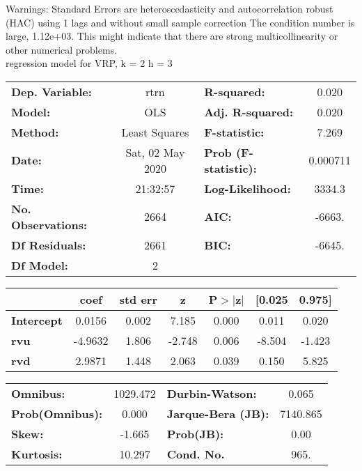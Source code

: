 Warnings: \newline
 [1] Standard Errors are heteroscedasticity and autocorrelation robust (HAC) using 1 lags and without small sample correction \newline
 [2] The condition number is large, 1.12e+03. This might indicate that there are \newline
 strong multicollinearity or other numerical problems.\\ 

regression model for VRP, k = 2 h = 3\begin{center}
\begin{tabular}{lclc}
\toprule
\textbf{Dep. Variable:}    &       rtrn       & \textbf{  R-squared:         } &     0.020   \\
\textbf{Model:}            &       OLS        & \textbf{  Adj. R-squared:    } &     0.020   \\
\textbf{Method:}           &  Least Squares   & \textbf{  F-statistic:       } &     7.269   \\
\textbf{Date:}             & Sat, 02 May 2020 & \textbf{  Prob (F-statistic):} &  0.000711   \\
\textbf{Time:}             &     21:32:57     & \textbf{  Log-Likelihood:    } &    3334.3   \\
\textbf{No. Observations:} &        2664      & \textbf{  AIC:               } &    -6663.   \\
\textbf{Df Residuals:}     &        2661      & \textbf{  BIC:               } &    -6645.   \\
\textbf{Df Model:}         &           2      & \textbf{                     } &             \\
\bottomrule
\end{tabular}
\begin{tabular}{lcccccc}
                   & \textbf{coef} & \textbf{std err} & \textbf{z} & \textbf{P$> |$z$|$} & \textbf{[0.025} & \textbf{0.975]}  \\
\midrule
\textbf{Intercept} &       0.0156  &        0.002     &     7.185  &         0.000        &        0.011    &        0.020     \\
\textbf{rvu}       &      -4.9632  &        1.806     &    -2.748  &         0.006        &       -8.504    &       -1.423     \\
\textbf{rvd}       &       2.9871  &        1.448     &     2.063  &         0.039        &        0.150    &        5.825     \\
\bottomrule
\end{tabular}
\begin{tabular}{lclc}
\textbf{Omnibus:}       & 1029.472 & \textbf{  Durbin-Watson:     } &    0.065  \\
\textbf{Prob(Omnibus):} &   0.000  & \textbf{  Jarque-Bera (JB):  } & 7140.865  \\
\textbf{Skew:}          &  -1.665  & \textbf{  Prob(JB):          } &     0.00  \\
\textbf{Kurtosis:}      &  10.297  & \textbf{  Cond. No.          } &     965.  \\
\bottomrule
\end{tabular}
\end{center}

